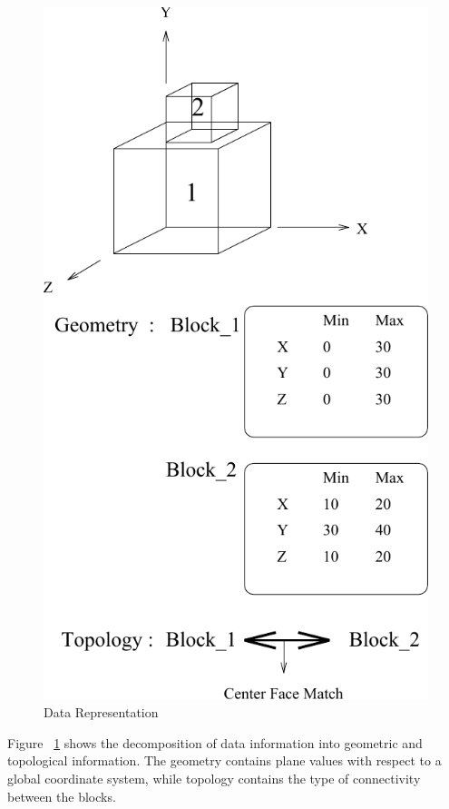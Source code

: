         \begin{figure}[htbp]
            \includegraphics{DATAREP.pdf}
            \caption{Data Representation}
            \label{datarep}
        \end{figure}

	Figure ~\ref{datarep} shows the decomposition of data information into
	geometric and topological information. The geometry contains plane values
	with respect to a global coordinate system, while topology contains the type
	of connectivity between the blocks.

